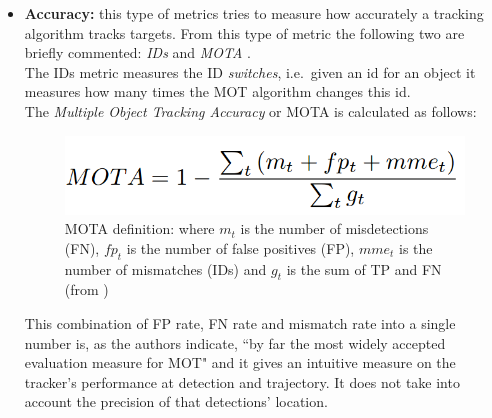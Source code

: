 \begin{itemize}
    \item \textbf{Accuracy:} this type of metrics tries to measure how accurately a tracking algorithm tracks targets. From this type of metric the following two are briefly commented: \textit{IDs} \cite{yamaguchi2011you} and \textit{MOTA} \cite{bernardin2008evaluating}.\\ The IDs metric measures the ID \textit{switches}, i.e.\ given an id for an object it measures how many times the MOT algorithm changes this id.\\ The \textit{Multiple Object Tracking Accuracy} or MOTA is calculated as follows:
    \begin{figure}[H]
    \begin{center}
    \includegraphics[scale=0.3]{figures/mota.png}
    \caption{MOTA definition: where $m_t$ is the number of misdetections (FN), $fp_t$ is the number of false positives (FP), $mme_t$ is the number of mismatches (IDs) and $g_t$ is the sum of TP and FN (from \cite{bernardin2008evaluating})}
    \label{fig:mota}
    \end{center}
    \end{figure}
    This combination of FP rate, FN rate and mismatch rate into a single number is, as the authors indicate, ``by far the most widely accepted evaluation measure for MOT" \cite{milan2016mot16} and it gives an intuitive measure on the tracker's performance at detection and trajectory. It does not take into account the precision of that detections' location.


\end{itemize}

